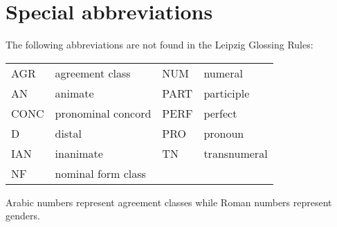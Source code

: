 \documentclass[output=collectionpaper]{langsci/langscibook}
\begin{document}
\section*{Special abbreviations}

\noindent The following abbreviations are not found in the Leipzig Glossing Rules:
\medskip

\begin{tabular}{llll}
AGR 	&	 agreement class 	&	NUM 	&	  numeral	\\
AN  	&	 animate & PART 	&	  participle	\\
CONC  	&	 pronominal concord &	PERF  	&	 perfect	\\
D 	&	  distal 	&	PRO  	&	 pronoun	\\
IAN  	&	 inanimate &	TN 	&	  transnumeral	\\
 NF 	&	  nominal form class && \\

\end{tabular}
\medskip

\noindent Arabic numbers represent agreement classes while Roman numbers represent genders.

\sloppy
\printbibliography[heading=subbibliography,notkeyword=this]
\end{document}
